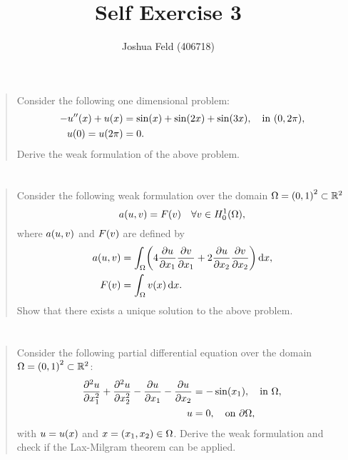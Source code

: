 \documentclass[english]{exercise}
\title{Self Exercise 3}
\author{Joshua Feld (406718)}
\begin{document}
	\maketitle


	\section{}

	\begin{quote}
		Consider the following one dimensional problem:
		\begin{align*}
			-u''\parentheses*{x} + u\parentheses*{x} &= \sin\parentheses*{x} + \sin\parentheses*{2x} + \sin\parentheses*{3x}, \quad \text{in }\parentheses*{0, 2\pi},\\
			u\parentheses*{0} = u\parentheses*{2\pi} &= 0.
		\end{align*}
		Derive the weak formulation of the above problem.
	\end{quote}


	\section{}

	\begin{quote}
		Consider the following weak formulation over the domain \(\Omega = \parentheses*{0, 1}^2 \subset \R^2\)
		\[
			a\parentheses*{u, v} = F\parentheses*{v} \quad \forall v \in H_0^1\parentheses*{\Omega},
		\]
		where \(a\parentheses*{u, v}\) and \(F\parentheses*{v}\) are defined by
		\begin{align*}
			a\parentheses*{u, v} &= \int_\Omega \parentheses*{4\frac{\partial u}{\partial x_1}\frac{\partial v}{\partial x_1} + 2\frac{\partial u}{\partial x_2}\frac{\partial v}{\partial x_2}}\d x,\\
			F\parentheses*{v} &= \int_\Omega v\parentheses*{x}\d x.
		\end{align*}
		Show that there exists a unique solution to the above problem.
	\end{quote}


	\section{}

	\begin{quote}
		Consider the following partial differential equation over the domain \(\Omega = \parentheses*{0, 1}^2 \subset \R^2\):
		\begin{align*}
			\frac{\partial^2 u}{\partial x_1^2} + \frac{\partial^2 u}{\partial x_2^2} - \frac{\partial u}{\partial x_1} - \frac{\partial u}{\partial x_2} &= -\sin\parentheses*{x_1}, \quad \text{in }\Omega,\\
			u &= 0, \quad \text{on }\partial\Omega,
		\end{align*}
		with \(u = u\parentheses*{x}\) and \(x = \parentheses*{x_1, x_2} \in \Omega\).
		Derive the weak formulation and check if the Lax-Milgram theorem can be applied.
	\end{quote}
\end{document}
